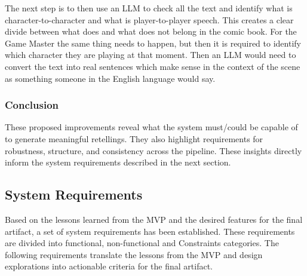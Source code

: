 The next step is to then use an LLM to check all the text and identify what is character-to-character and what is player-to-player speech. This creates a clear divide between what does and what does not belong in the comic book. For the Game Master the same thing needs to happen, but then it is required to identify which character they are playing at that moment. Then an LLM would need to convert the text into real sentences which make sense in the context of the scene as something someone in the English language would say.

\subsubsection{Conclusion}
These proposed improvements reveal what the system must/could be capable of to generate meaningful retellings. They also highlight requirements for robustness, structure, and consistency across the pipeline. These insights directly inform the system requirements described in the next section.

\subsection{System Requirements}
\label{sec:SystemRequirements}
Based on the lessons learned from the MVP and the desired features for the final artifact, a set of system requirements has been established. These requirements are divided into functional, non-functional and Constraints categories. The following requirements translate the lessons from the MVP and design explorations into actionable criteria for the final artifact.

